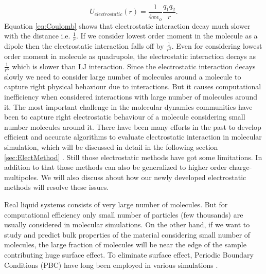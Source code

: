\begin{equation}
U_{electrostatic}(r) = \frac{1}{4\pi \epsilon_o}\frac{q_1 q_2}{r}.
\label{eq:Coulomb}
\end{equation}
Equation \ref{eq:Coulomb} shows that electrostatic interaction decay much slower with the distance i.e. $ \frac{1}{r}$. If we consider lowest order moment in the molecule as a dipole then the electrostatic interaction falls off by $\frac{1}{r^3}$. Even for considering lowest order moment in molecule as quadrupole, the electrostatic interaction decays as $\frac{1}{r^5}$ which is slower than LJ interaction. Since the electrostatic interaction decays slowly we need to consider large number of molecules around a molecule to capture right physical behaviour due to interactions. But it causes computational inefficiency when considered interactions with large number of molecules around it. The most important challenge in the molecular dynamics communities have been to capture right electrostatic behaviour of a molecule considering small number molecules around it. There have been many efforts in the past to develop efficient and accurate algorithms to evaluate electrostatic interaction in molecular simulation, which will be discussed in detail in the following section \ref{sec:ElectMethod} . Still those electrostatic methods have got some limitations. In addition to that those methods can also be generalized to higher order charge-multipoles. We will also discuss about how our newly developed electrostatic methods will resolve these issues.    

Real liquid systems consists of very large number of molecules. But for computational efficiency only small number of particles (few thousands) are usually considered in molecular simulations. On the other hand, if we want to study and predict bulk properties of the material considering small number of molecules, the large fraction of molecules will be near the edge of the sample contributing huge surface effect. To eliminate surface effect, Periodic Boundary Conditions (PBC) have long been employed in various simulations \cite{Born1912}.
 
